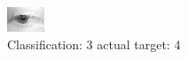 \begin{figure}[h!]
\begin{center}
\includegraphics[width=0.60\columnwidth]{figures/ID2627_class_3_target_4.png}
\end{center}
\caption{ Classification: 3 actual target: 4}
\label{fig:ID2627_class_3_target_4}
\end{figure}
